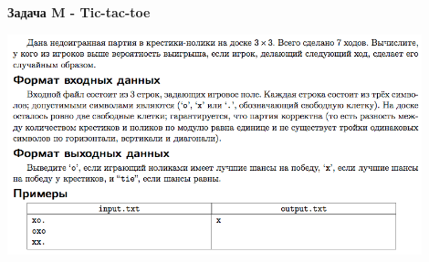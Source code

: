 \documentclass[a4paper,12pt]{article}
\begin{document}
\textbf{{\large Задача M - Tic-tac-toe}} \\
\begin{center}
\includegraphics[width=0.9\textwidth]{OC_Udmurtia/OC_Udmurtia_M.png}\\ [1cm]
\end{center}
\newpage
\end{document}
